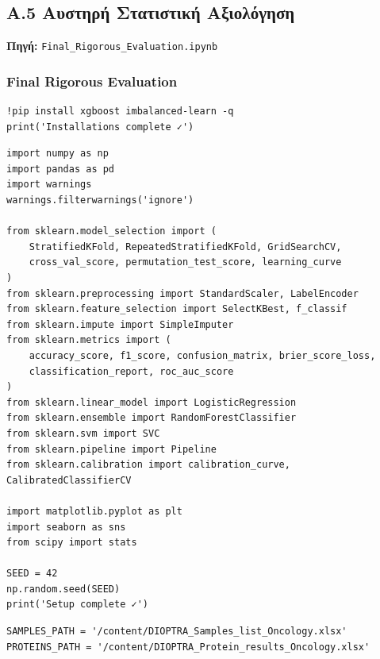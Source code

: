 \subsection{A.5 Αυστηρή Στατιστική Αξιολόγηση}
 
\noindent \textbf{Πηγή:} \texttt{Final\_Rigorous\_Evaluation.ipynb}
 
 
\subsubsection*{Final Rigorous Evaluation}
 
\begin{lstlisting}
!pip install xgboost imbalanced-learn -q
print('Installations complete ✓')
\end{lstlisting}
 
\begin{lstlisting}
import numpy as np
import pandas as pd
import warnings
warnings.filterwarnings('ignore')
 
from sklearn.model_selection import (
    StratifiedKFold, RepeatedStratifiedKFold, GridSearchCV,
    cross_val_score, permutation_test_score, learning_curve
)
from sklearn.preprocessing import StandardScaler, LabelEncoder
from sklearn.feature_selection import SelectKBest, f_classif
from sklearn.impute import SimpleImputer
from sklearn.metrics import (
    accuracy_score, f1_score, confusion_matrix, brier_score_loss,
    classification_report, roc_auc_score
)
from sklearn.linear_model import LogisticRegression
from sklearn.ensemble import RandomForestClassifier
from sklearn.svm import SVC
from sklearn.pipeline import Pipeline
from sklearn.calibration import calibration_curve, CalibratedClassifierCV
 
import matplotlib.pyplot as plt
import seaborn as sns
from scipy import stats
 
SEED = 42
np.random.seed(SEED)
print('Setup complete ✓')
\end{lstlisting}
 
\begin{lstlisting}
SAMPLES_PATH = '/content/DIOPTRA_Samples_list_Oncology.xlsx'
PROTEINS_PATH = '/content/DIOPTRA_Protein_results_Oncology.xlsx'
\end{lstlisting}
 
